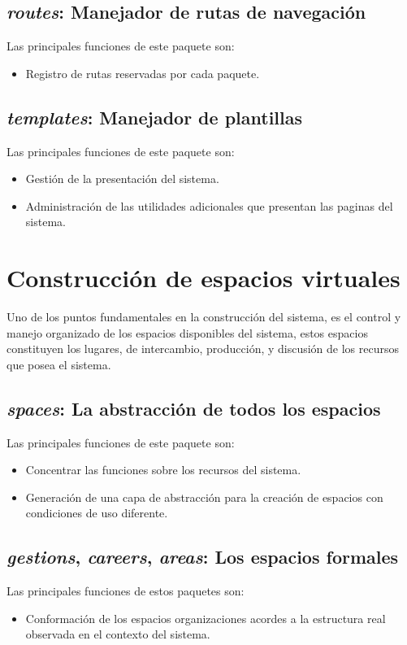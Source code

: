 \subsection{\emph{routes}: Manejador de rutas de navegación}
Las principales funciones de este paquete son:
\begin{itemize}
\item Registro de rutas reservadas por cada paquete.
\end{itemize}

\subsection{\emph{templates}: Manejador de plantillas}
Las principales funciones de este paquete son:
\begin{itemize}
\item Gestión de la presentación del sistema.
\item Administración de las utilidades adicionales que presentan las paginas
del sistema.
\end{itemize}

\section{Construcción de espacios virtuales}
Uno de los puntos fundamentales en la construcción del sistema, es el control y
manejo organizado de los espacios disponibles del sistema, estos espacios
constituyen los lugares, de intercambio, producción, y discusión de los
recursos que posea el sistema.

\subsection{\emph{spaces}: La abstracción de todos los espacios}
Las principales funciones de este paquete son:
\begin{itemize}
\item Concentrar las funciones sobre los recursos del sistema.
\item Generación de una capa de abstracción para la creación de espacios con
condiciones de uso diferente.
\end{itemize}

\subsection{\emph{gestions}, \emph{careers}, \emph{areas}: Los espacios
formales}
Las principales funciones de estos paquetes son:
\begin{itemize}
\item Conformación de los espacios organizaciones acordes a la estructura real
observada en el contexto del sistema.
\end{itemize}

